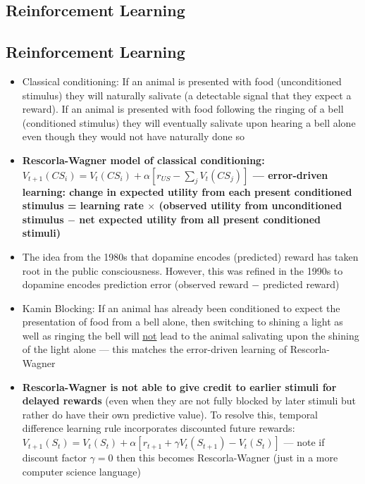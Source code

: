 \documentclass[20pt,a4paper,landscape]{extarticle}
\begin{document}
\begin{flushleft}
\section{Reinforcement Learning}
\subsection{Reinforcement Learning}
\begin{itemize}
\item Classical conditioning: If an animal is presented with food (unconditioned stimulus) they will naturally salivate (a detectable signal that they expect a reward). If an animal is presented with food following the ringing of a bell (conditioned stimulus) they will eventually salivate upon hearing a bell alone even though they would not have naturally done so
\item \textbf{Rescorla-Wagner model of classical conditioning: \boldmath$V_{t+1}(CS_i) = V_{t}(CS_i) + \alpha\left[r_{US} - \sum_j V_t(CS_j)\right]$ --- error-driven learning: change in expected utility from each present conditioned stimulus = learning rate $\times$ (observed utility from unconditioned stimulus $-$ net expected utility from all present conditioned stimuli)}
\item The idea from the 1980s that dopamine encodes (predicted) reward has taken root in the public consciousness. However, this was refined in the 1990s to dopamine encodes prediction error (observed reward $-$ predicted reward)
\item Kamin Blocking: If an animal has already been conditioned to expect the presentation of food from a bell alone, then switching to shining a light as well as ringing the bell will \underline{not} lead to the animal salivating upon the shining of the light alone --- this matches the error-driven learning of Rescorla-Wagner
\item \textbf{Rescorla-Wagner is not able to give credit to earlier stimuli for delayed rewards} (even when they are not fully blocked by later stimuli but rather do have their own predictive value). To resolve this, temporal difference learning rule incorporates discounted future rewards: $V_{t+1}(S_t) = V_{t}(S_t) + \alpha\left[r_{t+1} + \gamma V_t(S_{t+1}) - V_t(S_t)\right]$ --- note if discount factor $\gamma=0$ then this becomes Rescorla-Wagner (just in a more computer science language)
\end{itemize}

\end{flushleft}
\end{document}
